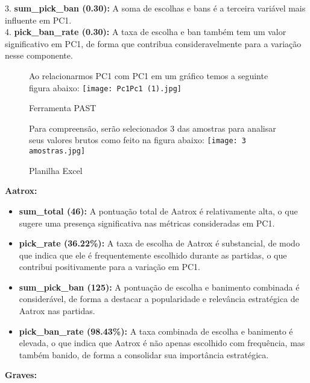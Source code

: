 \documentclass[a4paper,12pt]{article}
\begin{document}
3. \textbf{sum\_pick\_ban (0.30):} A soma de escolhas e bans é a terceira variável mais influente em PC1.\\

4. \textbf{pick\_ban\_rate (0.30):} A taxa de escolha e ban também tem um valor significativo em PC1, de forma que contribua consideravelmente para a variação nesse componente.\\



\begin{figure}[h]
Ao relacionarmos PC1 com PC1 em um gráfico temos a seguinte figura abaixo:
    \centering
    \texttt{[image: Pc1Pc1 (1).jpg]}
    \caption{Ferramenta PAST}
    \label{fig:enter-label}
\end{figure}
\pagebreak
\begin{figure}[h]
Para compreensão, serão selecionados 3 das amostras para analisar seus valores brutos como feito na figura abaixo:
    \centering
    \texttt{[image: 3 amostras.jpg]}
    \caption{Planilha Excel}
    \label{fig:enter-label}
\end{figure}

\begin{flushleft}
\textbf{Aatrox:}
\end{flushleft}

\begin{itemize}
  \item \textbf{sum\_total (46):} A pontuação total de Aatrox é relativamente alta, o que sugere uma presença significativa nas métricas consideradas em PC1.
  \item \textbf{pick\_rate (36.22\%):} A taxa de escolha de Aatrox é substancial, de modo que indica que ele é frequentemente escolhido durante as partidas, o que contribui positivamente para a variação em PC1.
  \item \textbf{sum\_pick\_ban (125):} A pontuação de escolha e banimento combinada é considerável, de forma a destacar a popularidade e relevância estratégica de Aatrox nas partidas.
  \item \textbf{pick\_ban\_rate (98.43\%):} A taxa combinada de escolha e banimento é elevada, o que indica que Aatrox é não apenas escolhido com frequência, mas também banido, de forma a consolidar sua importância estratégica.
\end{itemize}
\pagebreak


\begin{flushleft}
\textbf{Graves:}
\end{flushleft}
\end{document}
